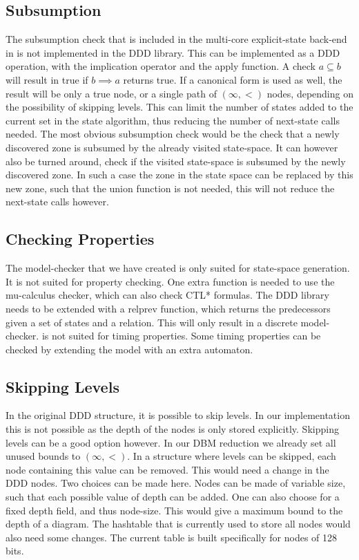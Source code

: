 \subsection{Subsumption}
The subsumption check that is included in the multi-core explicit-state back-end in \ltsmin{} is not implemented in the DDD library. This can be implemented as a DDD operation, with the implication operator and the apply function. A check $a \subseteq b$ will result in true if $b \implies a$ returns true. If a canonical form is used as well, the result will be only a true node, or a single path of $(\infty,<)$ nodes, depending on the possibility of skipping levels. This can limit the number of states added to the current set in the state algorithm, thus reducing the number of next-state calls needed. The most obvious subsumption check would be the check that a newly discovered zone is subsumed by the already visited state-space. It can however also be turned around, check if the visited state-space is subsumed by the newly discovered zone. In such a case the zone in the state space can be replaced by this new zone, such that the union function is not needed, this will not reduce the next-state calls however.

\subsection{Checking Properties}
The model-checker that we have created is only suited for state-space generation. It is not suited for property checking. One extra function is needed to use the \ltsmin{} mu-calculus checker, which can also check CTL* formulas. The DDD library needs to be extended with a relprev function, which returns the predecessors given a set of states and a relation. This will only result in a discrete model-checker. \ltsmin{} is not suited for timing properties. Some timing properties can be checked by extending the model with an extra automaton.

\subsection{Skipping Levels}
In the original DDD structure, it is possible to skip levels. In our implementation this is not possible as the depth of the nodes is only stored explicitly. Skipping levels can be a good option however. In our DBM reduction we already set all unused bounds to $(\infty,<)$. In a structure where levels can be skipped, each node containing this value can be removed. This would need a change in the DDD nodes. Two choices can be made here. Nodes can be made of variable size, such that each possible value of depth can be added. One can also choose for a fixed depth field, and thus node-size. This would give a maximum bound to the depth of a diagram. The hashtable that is currently used to store all nodes would also need some changes. The current table is built specifically for nodes of 128 bits. 

